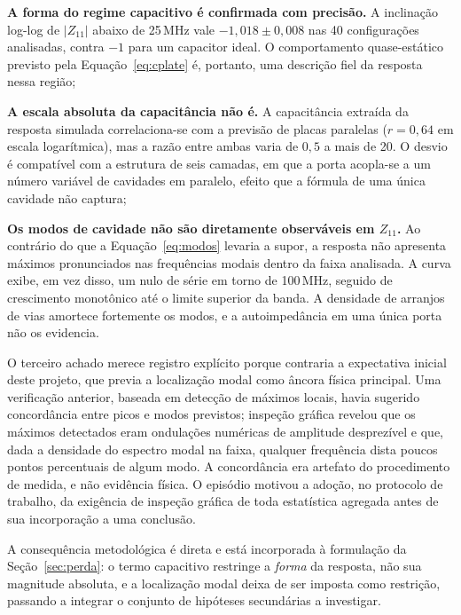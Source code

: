\begin{alineas}
\item \textbf{A forma do regime capacitivo é confirmada com precisão.} A
inclinação log-log de $|Z_{11}|$ abaixo de 25\,MHz vale $-1{,}018 \pm 0{,}008$
nas 40 configurações analisadas, contra $-1$ para um capacitor ideal. O
comportamento quase-estático previsto pela Equação~\ref{eq:cplate} é, portanto,
uma descrição fiel da resposta nessa região;

\item \textbf{A escala absoluta da capacitância não é.} A capacitância extraída
da resposta simulada correlaciona-se com a previsão de placas paralelas
($r = 0{,}64$ em escala logarítmica), mas a razão entre ambas varia de $0{,}5$ a
mais de 20. O desvio é compatível com a estrutura de seis camadas, em que a
porta acopla-se a um número variável de cavidades em paralelo, efeito que a
fórmula de uma única cavidade não captura;

\item \textbf{Os modos de cavidade não são diretamente observáveis em
$Z_{11}$.} Ao contrário do que a Equação~\ref{eq:modos} levaria a supor, a
resposta não apresenta máximos pronunciados nas frequências modais dentro da
faixa analisada. A curva exibe, em vez disso, um nulo de série em torno de
100\,MHz, seguido de crescimento monotônico até o limite superior da banda. A
densidade de arranjos de vias amortece fortemente os modos, e a autoimpedância
em uma única porta não os evidencia.
\end{alineas}

O terceiro achado merece registro explícito porque contraria a expectativa
inicial deste projeto, que previa a localização modal como âncora física
principal. Uma verificação anterior, baseada em detecção de máximos locais,
havia sugerido concordância entre picos e modos previstos; inspeção gráfica
revelou que os máximos detectados eram ondulações numéricas de amplitude
desprezível e que, dada a densidade do espectro modal na faixa, qualquer
frequência dista poucos pontos percentuais de algum modo. A concordância era
artefato do procedimento de medida, e não evidência física. O episódio motivou a
adoção, no protocolo de trabalho, da exigência de inspeção gráfica de toda
estatística agregada antes de sua incorporação a uma conclusão.

A consequência metodológica é direta e está incorporada à formulação da
Seção~\ref{sec:perda}: o termo capacitivo restringe a \emph{forma} da resposta,
não sua magnitude absoluta, e a localização modal deixa de ser imposta como
restrição, passando a integrar o conjunto de hipóteses secundárias a investigar.

